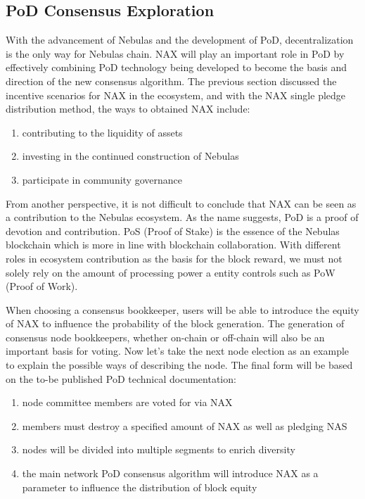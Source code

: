 \subsection{PoD Consensus Exploration}
With the advancement of Nebulas and the development of PoD, decentralization is the only way for Nebulas chain. NAX will play an important role in PoD by effectively combining PoD technology being developed to become the basis and direction of the new consensus algorithm. The previous section discussed the incentive scenarios for NAX in the ecosystem, and with the NAX single pledge distribution method, the ways to obtained NAX include:

\begin{enumerate}[\hspace{1cm}(i)]
  \item contributing to the liquidity of assets
  \item investing in the continued construction of Nebulas
  \item participate in community governance
\end{enumerate}

From another perspective, it is not difficult to conclude that NAX can be seen as a contribution to the Nebulas ecosystem. As the name suggests, PoD is a proof of devotion and contribution. PoS (Proof of Stake) is the essence of the Nebulas blockchain which is more in line with blockchain collaboration. With different roles in ecosystem contribution as the basis for the block reward, we must not solely rely on the amount of processing power a entity controls such as PoW (Proof of Work).

When choosing a consensus bookkeeper, users will be able to introduce the equity of NAX to influence the probability of the block generation. The generation of consensus node bookkeepers, whether on-chain or off-chain will also be an important basis for voting. Now let's take the next node election as an example to explain the possible ways of describing the node. The final form will be based on the to-be published PoD technical documentation:

\begin{enumerate}[\hspace{1cm}(a)]
  \item node committee members are voted for via NAX
  \item members must destroy a specified amount of NAX as well as pledging NAS
  \item nodes will be divided into multiple segments to enrich diversity
  \item the main network PoD consensus algorithm will introduce NAX as a parameter to influence the distribution of block equity
\end{enumerate}


